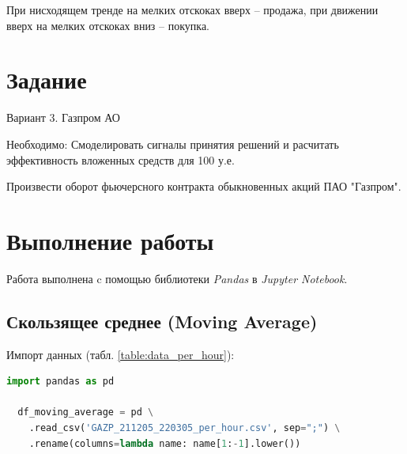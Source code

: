 \documentclass[14pt,a4paper]{extarticle}%
\begin{document}
При нисходящем тренде на мелких отскоках вверх – продажа, при
движении вверх на мелких отскоках вниз – покупка.

\section{Задание}
Вариант 3. Газпром АО

Необходимо:
Смоделировать сигналы принятия решений и расчитать эффективность вложенных
средств для 100 у.е.

Произвести оборот фьючерсного контракта обыкновенных акций ПАО "Газпром".


\pagebreak

\section{Выполнение работы}
Работа выполнена c помощью библиотеки \textit{Pandas} в \textit{Jupyter Notebook}.

\subsection{Скользящее среднее (Moving Average)}

Импорт данных (табл. \ref{table:data_per_hour}):

\begin{lstlisting}[basicstyle=\small, language=Python]
  import pandas as pd

  df_moving_average = pd \
    .read_csv('GAZP_211205_220305_per_hour.csv', sep=";") \
    .rename(columns=lambda name: name[1:-1].lower())
\end{lstlisting}
\end{document}
